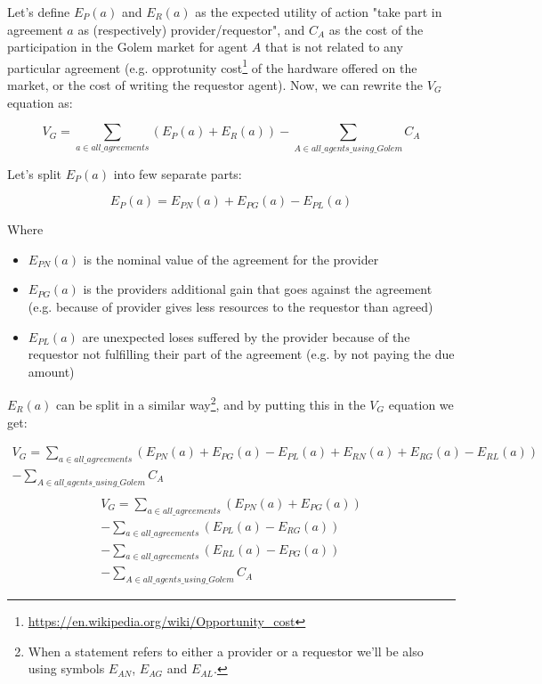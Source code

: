 \documentclass{article}
\begin{document}
Let's define $E_P(a)$ and $E_R(a)$ as the expected utility of action "take part in agreement $a$ as (respectively) provider/requestor", and $C_A$ as the cost of
the participation in the Golem market for agent $A$ that is not related to any particular agreement 
(e.g. opprotunity cost\footnote{\href{https://en.wikipedia.org/wiki/Opportunity\_cost}{https://en.wikipedia.org/wiki/Opportunity\_cost}} of the hardware offered on the market, 
or the cost of writing the requestor agent). Now, we can rewrite the $V_G$ equation as:

\begin{equation}
    V_G = \sum_{a \in all\_agreements}(E_P(a) + E_R(a)) - \sum_{A \in all\_agents\_using\_Golem}C_A
\end{equation}

Let's split $E_P(a)$ into few separate parts:


\begin{equation}
    E_P(a) = E_{PN}(a) + E_{PG}(a) - E_{PL}(a)
\end{equation}

Where 
\begin{itemize}
\item{$E_{PN}(a)$ is the nominal value of the agreement for the provider}
\item{$E_{PG}(a)$ is the providers additional gain that goes against the agreement (e.g. because of provider gives less resources to the requestor than agreed)}
\item{$E_{PL}(a)$ are unexpected loses suffered by the provider because of the requestor not fulfilling their part of the agreement (e.g. by not paying the due amount)}
\end{itemize}

$E_R(a)$ can be split in a similar way\footnote{
    When a statement refers to either a provider or a requestor we'll be also using symbols $E_{AN}$, $E_{AG}$ and $E_{AL}$.
}, and by putting this in the $V_G$ equation we get:


\begin{equation}
\begin{split}
    V_G = \sum_{a \in all\_agreements}(E_{PN}(a) + E_{PG}(a) - E_{PL}(a) + E_{RN}(a) + E_{RG}(a) - E_{RL}(a)) \\
            - \sum_{A \in all\_agents\_using\_Golem}C_A \\
\end{split}
\end{equation}
\begin{equation}
\begin{split}
    V_G = \sum_{a \in all\_agreements}(E_{PN}(a) + E_{PG}(a)) \\
          - \sum_{a \in all\_agreements}(E_{PL}(a)- E_{RG}(a)) \\
          - \sum_{a \in all\_agreements}(E_{RL}(a)- E_{PG}(a)) \\
          - \sum_{A \in all\_agents\_using\_Golem}C_A
\end{split}
\end{equation}
\end{document}
